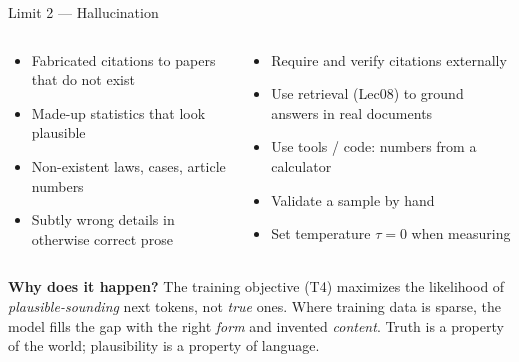 \begin{frame}{Limit 2 --- Hallucination}
\begin{columns}[T]
\begin{tcolorbox}[colback=red!5, colframe=red!50!black, title=\textbf{What it looks like}]
\small
\begin{itemize}
\item Fabricated citations to papers that do not exist
\item Made-up statistics that look plausible
\item Non-existent laws, cases, article numbers
\item Subtly wrong details in otherwise correct prose
\end{itemize}
\end{tcolorbox}

\begin{tcolorbox}[colback=green!5, colframe=green!40!black, title=\textbf{Mitigations}]
\small
\begin{itemize}
\item Require and verify citations externally
\item Use retrieval (Lec08) to ground answers in real documents
\item Use tools / code: numbers from a calculator
\item Validate a sample by hand
\item Set temperature $\tau = 0$ when measuring
\end{itemize}
\end{tcolorbox}
\end{columns}

\medskip
\small\textbf{Why does it happen?} The training objective (T4) maximizes the likelihood of \emph{plausible-sounding} next tokens, not \emph{true} ones. Where training data is sparse, the model fills the gap with the right \emph{form} and invented \emph{content}. Truth is a property of the world; plausibility is a property of language.
\end{frame}


